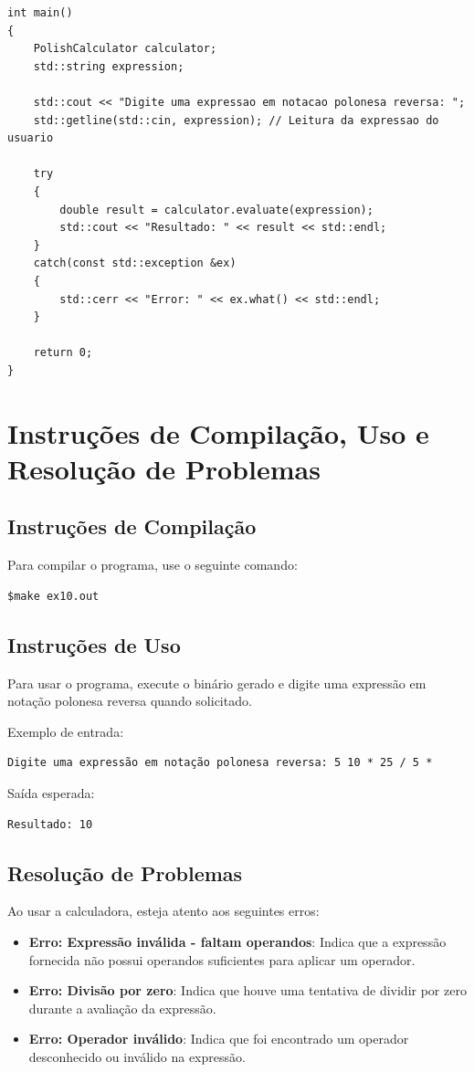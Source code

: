\documentclass[a4paper,12pt]{article}
\begin{document}
\begin{lstlisting}[caption={Implementação da função principal \texttt{Main}}, label={lst:main}]
int main()
{
    PolishCalculator calculator;
    std::string expression;

    std::cout << "Digite uma expressao em notacao polonesa reversa: ";
    std::getline(std::cin, expression); // Leitura da expressao do usuario

    try
    {
        double result = calculator.evaluate(expression);
        std::cout << "Resultado: " << result << std::endl;
    }
    catch(const std::exception &ex)
    {
        std::cerr << "Error: " << ex.what() << std::endl;
    }

    return 0;
}
\end{lstlisting}

\section{Instruções de Compilação, Uso e Resolução de Problemas}

\subsection{Instruções de Compilação}
Para compilar o programa, use o seguinte comando:
\begin{verbatim}
$make ex10.out
\end{verbatim}

\subsection{Instruções de Uso}
Para usar o programa, execute o binário gerado e digite uma expressão em notação polonesa reversa quando solicitado.

Exemplo de entrada:
\begin{verbatim}
Digite uma expressão em notação polonesa reversa: 5 10 * 25 / 5 *
\end{verbatim}
Saída esperada:
\begin{verbatim}
Resultado: 10
\end{verbatim}

\subsection{Resolução de Problemas}
Ao usar a calculadora, esteja atento aos seguintes erros:
\begin{itemize}
    \item \textbf{Erro: Expressão inválida - faltam operandos}: Indica que a expressão fornecida não possui operandos suficientes para aplicar um operador.
    \item \textbf{Erro: Divisão por zero}: Indica que houve uma tentativa de dividir por zero durante a avaliação da expressão.
    \item \textbf{Erro: Operador inválido}: Indica que foi encontrado um operador desconhecido ou inválido na expressão.
\end{itemize}
\end{document}
